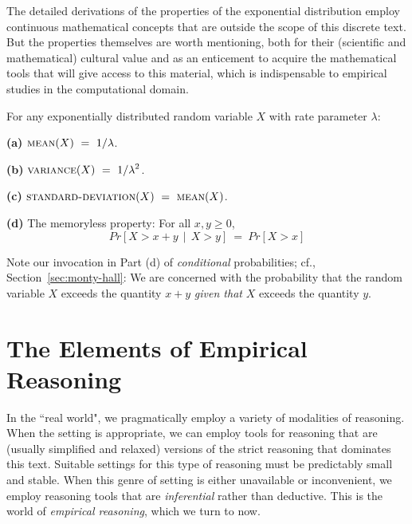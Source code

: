  
 

The detailed derivations of the properties of the exponential distribution employ continuous mathematical concepts that are outside the scope of this discrete text.  But the properties themselves are worth mentioning, both for their (scientific and mathematical) cultural value and as an enticement to acquire the mathematical tools that will give access to this material, which is indispensable to empirical studies in the computational domain.

\begin{prop}
\label{thm:exponential-moments}
For any exponentially distributed random variable $X$ with rate parameter $\lambda$:

{\bf (a)}
$\displaystyle \mbox{\sc mean}(X) \ = \ 1 / \lambda$.

\smallskip

{\bf (b)}
$\displaystyle \mbox{\sc variance}(X) \ = \ 1 / \lambda^2$.

\smallskip

{\bf (c)}
$\displaystyle  \mbox{\sc standard-deviation}(X) \ = \  \mbox{\sc mean}(X)$.

\medskip

{\bf (d)}
The memoryless property:  For all $x, y \geq 0$,
\[ Pr[X > x+y \ \ | \ \ X > y] \ = \ Pr[X > x] \]
\end{prop}

Note our invocation in Part (d) of {\em conditional} probabilities; cf.,
Section~\ref{sec:monty-hall}: We are concerned with the probability
that the random variable $X$ exceeds the quantity $x+y$ {\em given
  that} $X$ exceeds the quantity $y$.


\section{The Elements of Empirical Reasoning}
\label{sec:empirical}

In the ``real world", we pragmatically employ a variety of modalities of reasoning.  When the setting is appropriate, we can employ tools for reasoning that are (usually simplified and relaxed) versions of the strict reasoning that dominates this text.  Suitable settings for this type of reasoning must be predictably small and stable.  When this genre of setting is either unavailable or inconvenient, we employ reasoning tools that are {\em inferential} rather than deductive.  This is the world of {\em empirical reasoning}, which we turn to now.

